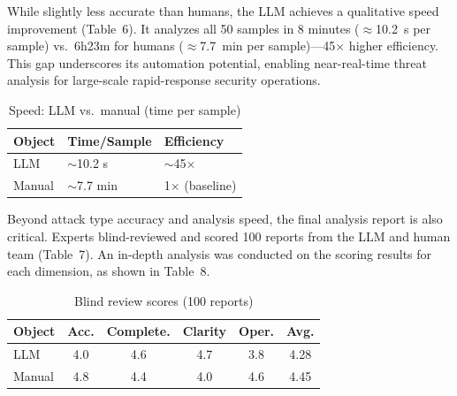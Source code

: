 \documentclass[sigconf,authordraft]{acmart}
\begin{document}
While slightly less accurate than humans, the LLM achieves a qualitative speed improvement (Table~6). It analyzes all 50 samples in 8 minutes ($\approx$10.2~s per sample) vs.\ 6h23m for humans ($\approx$7.7~min per sample)---45$\times$ higher efficiency. This gap underscores its automation potential, enabling near-real-time threat analysis for large-scale rapid-response security operations.

\begin{table}[htbp]
\centering
\caption{Speed: LLM vs.\ manual (time per sample)}
\small
\begin{tabular}{@{}p{1.8cm}p{2.2cm}p{2.4cm}@{}}
\toprule
\textbf{Object} & \textbf{Time/Sample} & \textbf{Efficiency} \\
\midrule
LLM & $\sim$10.2 s & $\sim$45$\times$ \\
Manual & $\sim$7.7 min & 1$\times$ (baseline) \\
\bottomrule
\end{tabular}
\end{table}

Beyond attack type accuracy and analysis speed, the final analysis report is also critical. Experts blind-reviewed and scored 100 reports from the LLM and human team (Table~7). An in-depth analysis was conducted on the scoring results for each dimension, as shown in Table~8.

\begin{table}[htbp]
\centering
\caption{Blind review scores (100 reports)}
\small
\setlength{\tabcolsep}{3pt}
\begin{tabular}{@{}p{1.4cm}ccccc@{}}
\toprule
\textbf{Object} & \textbf{Acc.} & \textbf{Complete.} & \textbf{Clarity} & \textbf{Oper.} & \textbf{Avg.} \\
\midrule
LLM & 4.0 & 4.6 & 4.7 & 3.8 & 4.28 \\
Manual & 4.8 & 4.4 & 4.0 & 4.6 & 4.45 \\
\bottomrule
\end{tabular}
\end{table}
\end{document}
